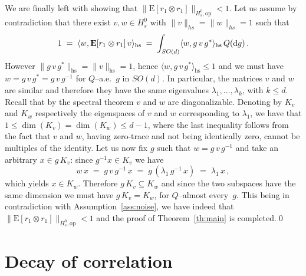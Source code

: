 \documentclass[a4paper,reqno,11pt]{amsart}
\numberwithin{equation}{section}
\newcommand{\gl}{\lambda}
\newcommand{\dd}{\text{\rm d}}             %
\def\bE{\ensuremath{\bs{\mathrm{E}}}}
\def\bs{\boldsymbol}
\begin{document}
We are finally left with showing that $\| \bE [r_1 \otimes r_1]\|_{H_s^0, \text{op}} < 1$.
Let us assume by contradiction that there exist
$v,w \in H_s^0$ with $\|v\|_{hs} = \|w\|_{hs} = 1$ such that
\begin{equation}
	1 \;=\; \langle w, \bE [r_1 \otimes r_1] \, v \rangle_{\text{hs}} \;=\; 
	\int_{SO(d)} \langle w, g\, v\, g^* \rangle_{\text{hs}} \, Q(\dd g) \,.
\end{equation}
However $\| g\, v\, g^* \|_{\text{hs}} = \| v \|_{\text{hs}} = 1$,
hence $\langle w, g\, v\, g^* \rangle_{\text{hs}} \le 1$ and
we must have $w = g\, v\, g^* = g\, v\, g^{-1}$ for $Q$--a.e.~$g$ in $SO(d)$.
In particular, the matrices $v$ and $w$ are similar and therefore
they have the same eigenvalues $\gl_1, \ldots, \gl_k$, with $k \le d$.
Recall that by the spectral theorem $v$ and $w$ are diagonalizable.
Denoting by $K_v$ and $K_w$ respectively the eigenspaces of $v$ and $w$
corresponding to $\gl_1$, we have that $1 \le \dim (K_v) = \dim (K_w) \le d-1$,
where the last inequality follows from the fact that $v$ and $w$,
having zero-trace and not being identically zero, 
cannot be multiples of the identity.
Let us now fix $g$ such that $w = g\, v\, g^{-1}$ and
take an arbitrary $x \in g \, K_v$: since $g^{-1} x \in K_v$ we have
\begin{equation}
	w\,x \;=\; g \, v \, g^{-1} \, x \;=\; g \, ( \gl_1 \, g^{-1} \, x) \;=\; \gl_1 \, x \,,
\end{equation}
which yields $x \in K_w$. Therefore $g \, K_v \subseteq K_w$ and since
the two subspaces have the same dimension we must have $g \, K_v = K_w$,
for $Q$--almost every~$g$. This being in contradiction with Assumption~\ref{ass:noise},
we have indeed that $\| \bE [r_1 \otimes r_1]\|_{H_s^0, \text{op}} < 1$ and the
proof of Theorem~\ref{th:main} is completed.\qed



\medskip

\section{Decay of correlation}
\label{sec:decay}



\smallskip
\end{document}
